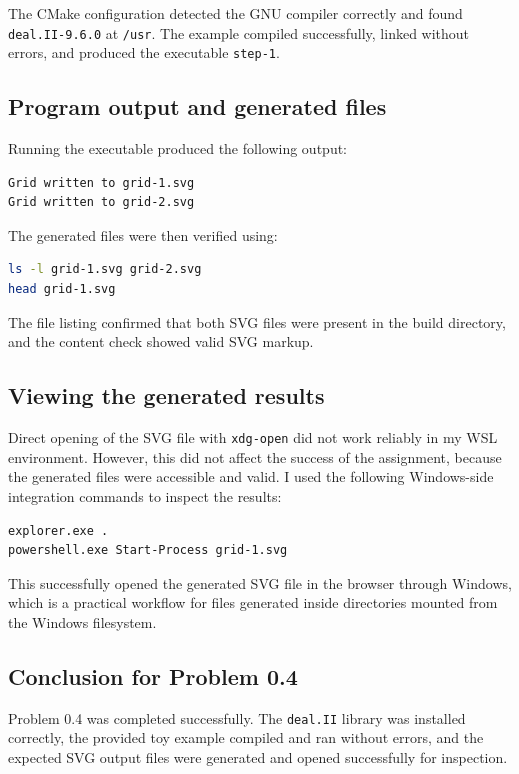 \documentclass[11pt,a4paper]{article}
\begin{document}
The CMake configuration detected the GNU compiler correctly and found \texttt{deal.II-9.6.0} at \texttt{/usr}. The example compiled successfully, linked without errors, and produced the executable \texttt{step-1}.

\subsection{Program output and generated files}
Running the executable produced the following output:

\begin{lstlisting}
Grid written to grid-1.svg
Grid written to grid-2.svg
\end{lstlisting}

The generated files were then verified using:

\begin{lstlisting}[language=bash]
ls -l grid-1.svg grid-2.svg
head grid-1.svg
\end{lstlisting}

The file listing confirmed that both SVG files were present in the build directory, and the content check showed valid SVG markup.

\subsection{Viewing the generated results}
Direct opening of the SVG file with \texttt{xdg-open} did not work reliably in my WSL environment. However, this did not affect the success of the assignment, because the generated files were accessible and valid. I used the following Windows-side integration commands to inspect the results:

\begin{lstlisting}[language=bash]
explorer.exe .
powershell.exe Start-Process grid-1.svg
\end{lstlisting}

This successfully opened the generated SVG file in the browser through Windows, which is a practical workflow for files generated inside directories mounted from the Windows filesystem.

\subsection{Conclusion for Problem 0.4}
Problem 0.4 was completed successfully. The \texttt{deal.II} library was installed correctly, the provided toy example compiled and ran without errors, and the expected SVG output files were generated and opened successfully for inspection.
\end{document}
